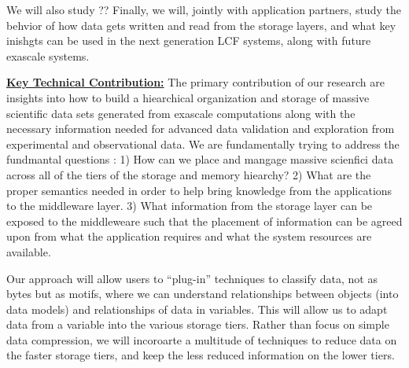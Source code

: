 \documentclass[11pt,letterpaper]{article}
\begin{document}
%
We will also study ??
%
Finally, we will, jointly with application partners, study the behvior of how data gets written and read from the storage layers, and
what key inishgts can be used in the next generation LCF systems, along with future exascale systems.

\underline{\textbf{Key Technical Contribution:}} The primary contribution of
our research are insights into how to build a hiearchical organization and storage
of massive scientific data sets generated from exascale computations along with 
the necessary information needed for advanced data validation and exploration from 
experimental and observational data. 
We are fundamentally trying to address the fundmantal questions : 1)  How can we 
place and mangage massive scienfici data across all of the tiers of the storage and memory
hiearchy? 2) What are the proper semantics needed in order to help bring knowledge from the applications
to the middleware layer. 3) What information from the storage layer can be exposed to the middleweare such
that the placement of information can be agreed upon from what the application requires and what the
system resources are available. 

Our approach will allow users to ``plug-in'' techniques to classify data, not as bytes but as motifs, where
we can understand relationships between objects (into data models) and relationships of data in variables.
This will allow us to adapt data from a variable into the various storage tiers. Rather than focus on simple data
compression, we will incoroarte a multitude of techniques to reduce data on the faster storage tiers, and keep the less
reduced information on the lower tiers.
\end{document}
